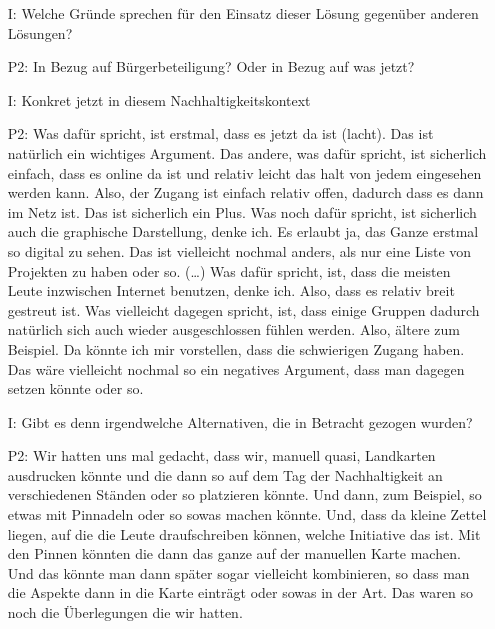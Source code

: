 \begin{itemize}
    Ich glaube, wenn man l{\"a}nger dar{\"u}ber nachdenkt, k{\"o}nnte man sicherlich auch noch viel mehr Anwendungsm{\"o}glichkeiten finden. Oder auch noch ein wichtiger Punkt, den ich eben schon im Kopf hatte, dass soziale Bewegungen die Karte zur Selbstreflexion benutzen k{\"o}nnten. Dass man erstmal {\"u}berhaupt seine Wirksamkeit sieht. Und auch dass es der Bewegung noch einen Schub gibt, von wegen in Richtung Transparenz.
    \item[I:] Welche Gr{\"u}nde sprechen f{\"u}r den Einsatz dieser L{\"o}sung gegen{\"u}ber anderen L{\"o}sungen?
    \item[P2:] In Bezug auf B{\"u}rgerbeteiligung? Oder in Bezug auf was jetzt?
    \item[I:] Konkret jetzt in diesem Nachhaltigkeitskontext
    \item[P2:] Was daf{\"u}r spricht, ist erstmal, dass es jetzt da ist (lacht). Das ist nat{\"u}rlich ein wichtiges Argument. Das andere, was daf{\"u}r spricht, ist sicherlich einfach, dass es online da ist und relativ leicht das halt von jedem eingesehen werden kann. Also, der Zugang ist einfach relativ offen, dadurch dass es dann im Netz ist. Das ist sicherlich ein Plus. Was noch daf{\"u}r spricht, ist sicherlich auch die graphische Darstellung, denke ich. Es erlaubt ja, das Ganze erstmal so digital zu sehen. Das ist vielleicht nochmal anders, als nur eine Liste von Projekten zu haben oder so. (\dots) Was daf{\"u}r spricht, ist, dass die meisten Leute inzwischen Internet benutzen, denke ich. Also, dass es relativ breit gestreut ist. Was vielleicht dagegen spricht, ist, dass einige Gruppen dadurch nat{\"u}rlich sich auch wieder ausgeschlossen f{\"u}hlen werden. Also, {\"a}ltere zum Beispiel. Da k{\"o}nnte ich mir vorstellen, dass die schwierigen Zugang haben. Das w{\"a}re vielleicht nochmal so ein negatives Argument, dass man dagegen setzen k{\"o}nnte oder so.
    \item[I:] Gibt es denn irgendwelche Alternativen, die in Betracht gezogen wurden?
    \item[P2:] Wir hatten uns mal gedacht, dass wir, manuell quasi, Landkarten ausdrucken k{\"o}nnte und die dann so auf dem Tag der Nachhaltigkeit an verschiedenen St{\"a}nden oder so platzieren k{\"o}nnte. Und dann, zum Beispiel, so etwas mit Pinnadeln oder so sowas machen k{\"o}nnte. Und, dass da kleine Zettel liegen, auf die die Leute draufschreiben k{\"o}nnen, welche Initiative das ist. Mit den Pinnen k{\"o}nnten die dann das ganze auf der manuellen Karte machen. Und das k{\"o}nnte man dann sp{\"a}ter sogar vielleicht kombinieren, so dass man die Aspekte dann in die Karte eintr{\"a}gt oder sowas in der Art. Das waren so noch die {\"U}berlegungen die wir hatten.

\end{itemize}
